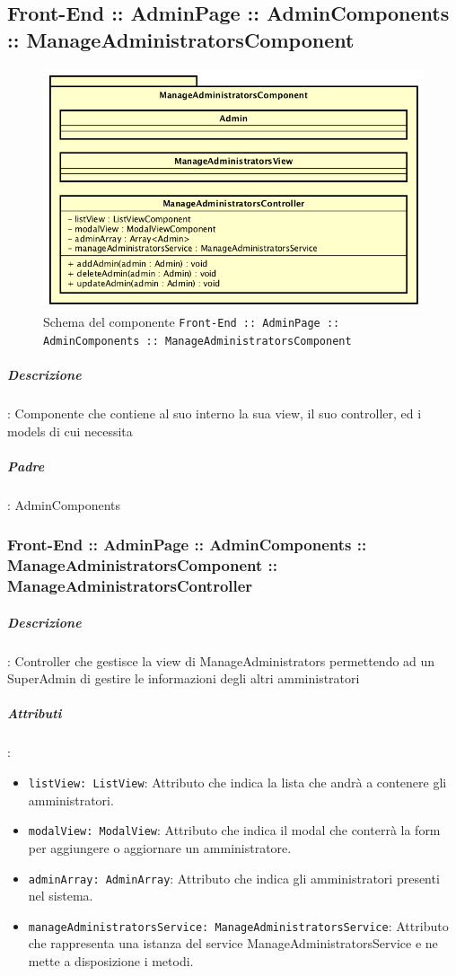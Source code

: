 \documentclass[../ManualeSviluppatore_v2.0.0.tex]{subfiles}
\begin{document}
	\subsection{Front-End :: AdminPage :: AdminComponents :: ManageAdministratorsComponent}
	\begin{figure}[!h]
		\centering
		\includegraphics[scale=0.6]{Architettura/Front-End/AdminPage/AdminComponents/ManageAdministratorsComponent.png}
		\caption{Schema del componente \texttt{Front-End :: AdminPage :: AdminComponents :: ManageAdministratorsComponent}}
	\end{figure}

			\subparagraph{Descrizione}: Componente che contiene al suo interno la sua view, il suo controller, ed i models di cui necessita
			\subparagraph{Padre}: AdminComponents
				\subsubsection{Front-End :: AdminPage :: AdminComponents :: ManageAdministratorsComponent :: ManageAdministratorsController}
		      		\subparagraph{Descrizione}: Controller che gestisce la view di ManageAdministrators permettendo ad un SuperAdmin di gestire le informazioni degli altri amministratori
			      	\subparagraph{Attributi}:
					\begin{itemize}
						\item \texttt{listView: ListView}: Attributo che indica la lista che andrà a contenere gli amministratori.
						\item \texttt{modalView: ModalView}: Attributo che indica il modal che conterrà la form per aggiungere o aggiornare un amministratore.
						\item \texttt{adminArray: AdminArray}: Attributo che indica gli amministratori presenti nel sistema.
						\item \texttt{manageAdministratorsService: ManageAdministratorsService}: Attributo che rappresenta una istanza del service ManageAdministratorsService e ne mette a disposizione i metodi.
					\end{itemize}
\end{document}
